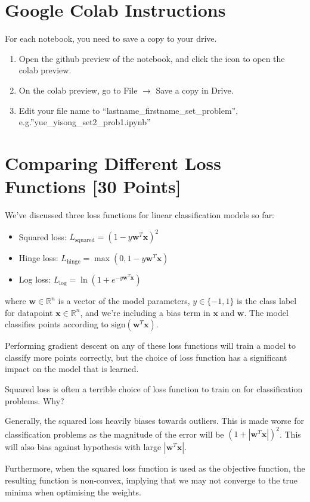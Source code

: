 \section*{Google Colab Instructions}
For each notebook, you need to save a copy to your drive.
\begin{enumerate}
	\item Open the github preview of the notebook, and click the icon to open the colab preview.
	\item On the colab preview, go to File $\rightarrow$ Save a copy in Drive.
	\item Edit your file name to “lastname_firstname_set_problem”, e.g.”yue_yisong_set2_prob1.ipynb”
\end{enumerate}



\newpage
\section{Comparing Different Loss Functions [30 Points]}

We've discussed three loss functions for linear classification models so far:
\begin{itemize}
\item Squared loss: $L_\text{squared} = (1 - y\mathbf{w}^T\mathbf{x})^2$
\item Hinge loss: $L_\text{hinge} = \max(0, 1 - y\mathbf{w}^T\mathbf{x})$
\item Log loss: $L_\text{log} = \ln(1 + e^{-y\mathbf{w}^T\mathbf{x}})$
\end{itemize}
where $\mathbf{w} \in \mathbb{R}^n$ is a vector of the model parameters, $y \in \{-1,1\}$ is the class label for datapoint $\mathbf{x} \in \mathbb{R}^n$, and we're including a bias term in $\mathbf{x}$ and $\mathbf{w}$.  The model classifies points according to $\text{sign}(\mathbf{w}^T\mathbf{x})$.

Performing gradient descent on any of these loss functions will train a model to classify more points correctly, but the choice of loss function has a significant impact on the model that is learned.

\problem[3]
Squared loss is often a terrible choice of loss function to train on for classification problems.  Why?

\begin{solution}
 Generally, the squared loss heavily biases towards outliers. This is made worse for classification problems as the magnitude of the error will be $(1+|\mathbf{w}^T\mathbf{x}|)^2$. This will also bias against hypothesis with large $|\mathbf{w}^T\mathbf{x}|$.

 Furthermore, when the squared loss function is used as the objective function, the resulting function is non-convex, implying that we may not converge to the true minima when optimising the weights. 
\end{solution}

